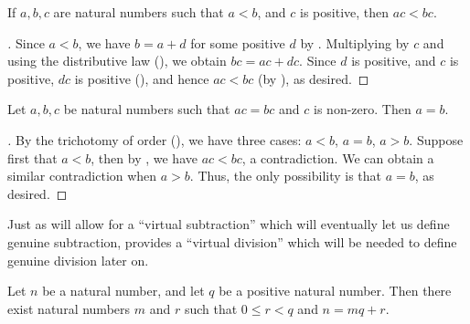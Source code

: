 \begin{prop}\label{i:2.3.6}
  If \(a, b, c\) are natural numbers such that \(a < b\), and \(c\) is positive, then \(ac < bc\).
\end{prop}

\begin{proof}[]
  Since \(a < b\), we have \(b = a + d\) for some positive \(d\) by .
  Multiplying by \(c\) and using the distributive law (), we obtain \(bc = ac + dc\).
  Since \(d\) is positive, and \(c\) is positive, \(dc\) is positive (), and hence \(ac < bc\) (by ), as desired.
\end{proof}

\begin{cor}\label{i:2.3.7}
  Let \(a, b, c\) be natural numbers such that \(ac = bc\) and \(c\) is non-zero.
  Then \(a = b\).
\end{cor}

\begin{proof}[]
  By the trichotomy of order (), we have three cases: \(a < b\), \(a = b\), \(a > b\).
  Suppose first that \(a < b\), then by , we have \(ac < bc\), a contradiction.
  We can obtain a similar contradiction when \(a > b\).
  Thus, the only possibility is that \(a = b\), as desired.
\end{proof}

\begin{rmk}\label{i:2.3.8}
  Just as  will allow for a ``virtual subtraction'' which will eventually let us define genuine subtraction,  provides a ``virtual division'' which will be needed to define genuine division later on.
\end{rmk}

\begin{prop}\label{i:2.3.9}
  Let \(n\) be a natural number, and let \(q\) be a positive natural number.
  Then there exist natural numbers \(m\) and \(r\) such that \(0 \leq r < q\) and \(n = mq + r\).
\end{prop}

